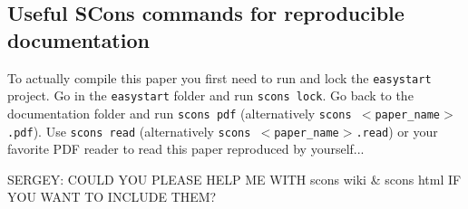 \subsection{Useful SCons commands for reproducible documentation}

To actually compile this paper you first need to run and lock the
\texttt{easystart} project. Go in the \texttt{easystart} folder and
run \texttt{scons lock}. Go back to the documentation folder and run
\texttt{scons pdf} (alternatively \texttt{scons
  $<$paper\_name$>$.pdf}). Use \texttt{scons read} (alternatively
\texttt{scons $<$paper\_name$>$.read}) or your favorite PDF reader to
read this paper reproduced by yourself...

SERGEY: COULD YOU PLEASE HELP ME WITH scons wiki \& scons html IF YOU
WANT TO INCLUDE THEM?




